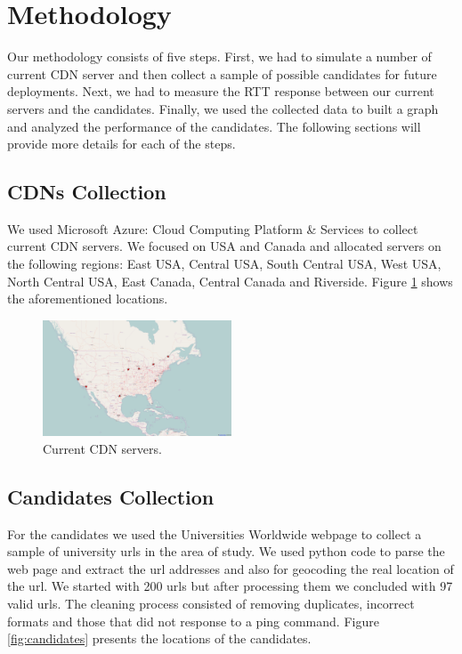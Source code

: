 \documentclass[11pt,twocolumn]{article}
\begin{document}
\section{Methodology}
Our methodology consists of five steps. First, we had to simulate a number of current CDN server and then collect a sample of possible candidates for future deployments.  Next, we had to measure the RTT response between our current servers and the candidates.  Finally, we used the collected data to built a graph and analyzed the performance of the candidates.  The following sections will provide more details for each of the steps.

\subsection{CDNs Collection}
We used Microsoft Azure: Cloud Computing Platform \& Services to collect current CDN servers.  We focused on USA and Canada and allocated servers on the following regions: East USA, Central USA, South Central USA, West USA, North Central USA, East Canada, Central Canada and Riverside.  Figure \ref{fig:cdns} shows the aforementioned locations.

\begin{figure}
  \centering
  \includegraphics[width=0.5\textwidth]{cdns.png}
  \caption{Current CDN servers.}\label{fig:cdns}
\end{figure}

\subsection{Candidates Collection}
For the candidates we used the Universities Worldwide webpage \cite{universities} to collect a sample of university urls in the area of study.  We used python code to parse the web page and extract the url addresses and also for geocoding the real location of the url.  We started with 200 urls but after processing them we concluded with 97 valid urls.  The cleaning process consisted of removing duplicates, incorrect formats and those that did not response to a ping command.  Figure \ref{fig:candidates} presents the locations of the candidates.
\end{document}
